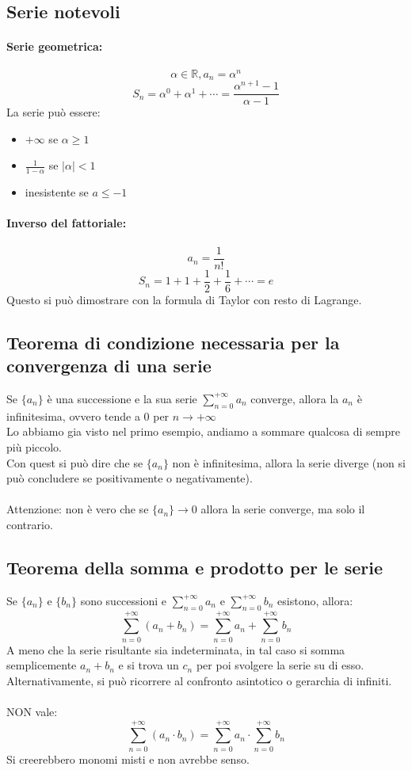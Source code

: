 \documentclass[12pt,a4paper]{article}
\begin{document}
\subsection{Serie notevoli}
\paragraph{Serie geometrica:}
\[
\alpha \in \mathbb{R}, a_n = \alpha^n
\]
\[
S_n = \alpha^0 + \alpha^1 + \cdots = \frac{\alpha^{n+1} - 1}{\alpha - 1}
\]
La serie può essere:
\begin{itemize}
  \item $+\infty$ se $\alpha \geq 1$
  \item $\frac{1}{1 - \alpha}$ se $|\alpha| < 1$
  \item inesistente se $a \leq -1$
\end{itemize}

\paragraph{Inverso del fattoriale:}
\[
a_n = \frac{1}{n!}
\]
\[
S_n = 1 + 1 + \frac{1}{2} + \frac{1}{6} + \cdots = e
\]
Questo si può dimostrare con la formula di Taylor con resto di Lagrange.

\subsection{Teorema di condizione necessaria per la convergenza di una serie}
Se $\{a_n\}$ è una successione e la sua serie $\sum_{n=0}^{+\infty} a_n$ converge, allora la $a_n$ è infinitesima, ovvero tende a $0$ per $n \to +\infty$\\
Lo abbiamo gia visto nel primo esempio, andiamo a sommare qualcosa di sempre più piccolo.\\
Con quest si può dire che se $\{a_n\}$ non è infinitesima, allora la serie diverge (non si può concludere se positivamente o negativamente).\\\\
Attenzione: non è vero che se $\{a_n\} \to 0$ allora la serie converge, ma solo il contrario.

\subsection{Teorema della somma e prodotto per le serie}
Se $\{a_n\}$ e $\{b_n\}$ sono successioni e $\sum_{n=0}^{+\infty} a_n$ e $\sum_{n=0}^{+\infty} b_n$ esistono, allora:
\[
\sum_{n=0}^{+\infty} (a_n + b_n) = \sum_{n=0}^{+\infty} a_n + \sum_{n=0}^{+\infty} b_n
\]
A meno che la serie risultante sia indeterminata, in tal caso si somma semplicemente $a_n + b_n$ e si trova un $c_n$ per poi svolgere la serie su di esso.\\
Alternativamente, si può ricorrere al confronto asintotico o gerarchia di infiniti.\\\\
NON vale:
\[
\sum_{n=0}^{+\infty} (a_n \cdot b_n) = \sum_{n=0}^{+\infty} a_n \cdot \sum_{n=0}^{+\infty} b_n
\]
Si creerebbero monomi misti e non avrebbe senso.
\end{document}
